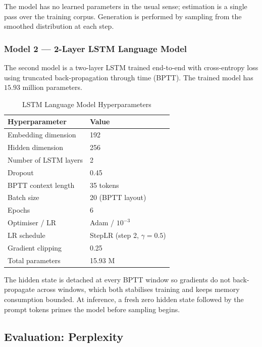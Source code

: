 The model has no learned parameters in the usual sense; estimation is a
single pass over the training corpus. Generation is performed by
sampling from the smoothed distribution at each step.

\subsubsection{Model 2 — 2-Layer LSTM Language Model}

The second model is a two-layer LSTM \cite{hochreiter1997lstm} trained
end-to-end with cross-entropy loss using truncated back-propagation
through time (BPTT). The trained model has $15.93$ million parameters.

\begin{table}[h]
\centering
\caption{LSTM Language Model Hyperparameters}
\label{tab:lstm_lm_hp}
\begin{tabular}{ll}
\toprule
Hyperparameter   & Value \\
\midrule
Embedding dimension      & 192 \\
Hidden dimension         & 256 \\
Number of LSTM layers    & 2 \\
Dropout                  & 0.45 \\
BPTT context length      & 35 tokens \\
Batch size               & 20 (BPTT layout) \\
Epochs                   & 6 \\
Optimiser / LR           & Adam / $10^{-3}$ \\
LR schedule              & StepLR (step 2, $\gamma=0.5$) \\
Gradient clipping        & 0.25 \\
Total parameters         & 15.93 M \\
\bottomrule
\end{tabular}
\end{table}

The hidden state is detached at every BPTT window so gradients do not
back-propagate across windows, which both stabilises training and keeps
memory consumption bounded. At inference, a fresh zero hidden state
followed by the prompt tokens primes the model before sampling begins.

\subsection{Evaluation: Perplexity}

